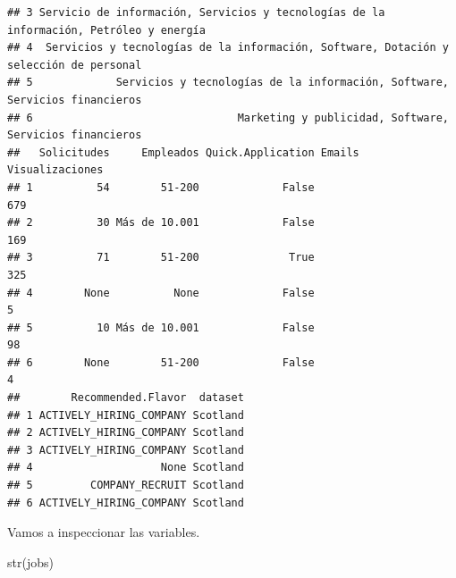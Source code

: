\documentclass[
]{article}
\newenvironment{Shaded}{\begin{snugshade}}{\end{snugshade}}
\newcommand{\KeywordTok}[1]{\textcolor[rgb]{0.94,0.87,0.69}{#1}}
\newcommand{\NormalTok}[1]{\textcolor[rgb]{0.80,0.80,0.80}{#1}}
\begin{document}
\begin{verbatim}
## 3 Servicio de información, Servicios y tecnologías de la información, Petróleo y energía
## 4  Servicios y tecnologías de la información, Software, Dotación y selección de personal
## 5             Servicios y tecnologías de la información, Software, Servicios financieros
## 6                                Marketing y publicidad, Software, Servicios financieros
##   Solicitudes     Empleados Quick.Application Emails Visualizaciones
## 1          54        51-200             False                    679
## 2          30 Más de 10.001             False                    169
## 3          71        51-200              True                    325
## 4        None          None             False                      5
## 5          10 Más de 10.001             False                     98
## 6        None        51-200             False                      4
##        Recommended.Flavor  dataset
## 1 ACTIVELY_HIRING_COMPANY Scotland
## 2 ACTIVELY_HIRING_COMPANY Scotland
## 3 ACTIVELY_HIRING_COMPANY Scotland
## 4                    None Scotland
## 5         COMPANY_RECRUIT Scotland
## 6 ACTIVELY_HIRING_COMPANY Scotland
\end{verbatim}

Vamos a inspeccionar las variables.

\begin{Shaded}
\begin{Highlighting}[]
\KeywordTok{str}\NormalTok{(jobs)}
\end{Highlighting}
\end{Shaded}
\end{document}
